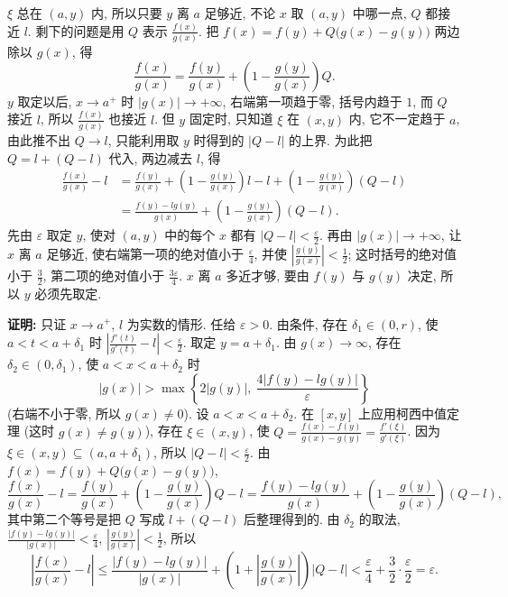 \documentclass[UTF8,openany]{ctexbook}
\theoremstyle{chinesetextbook}
\newenvironment{cnproof}{\par\indent\textbf{证明:} \ignorespaces}{\par}
\begin{document}
$\xi$ 总在 $(a,y)$ 内, 所以只要 $y$ 离 $a$ 足够近, 不论 $x$ 取 $(a,y)$ 中哪一点, $Q$ 都接近 $l$. 剩下的问题是用 $Q$ 表示 $\displaystyle\frac{f(x)}{g(x)}$. 把 $f(x)=f(y)+Q\bigl(g(x)-g(y)\bigr)$ 两边除以 $g(x)$, 得
\[
\frac{f(x)}{g(x)}=\frac{f(y)}{g(x)}+\left(1-\frac{g(y)}{g(x)}\right)Q.
\]
$y$ 取定以后, $x\to a^+$ 时 $|g(x)|\to+\infty$, 右端第一项趋于零, 括号内趋于 $1$, 而 $Q$ 接近 $l$, 所以 $\displaystyle\frac{f(x)}{g(x)}$ 也接近 $l$. 但 $y$ 固定时, 只知道 $\xi$ 在 $(x,y)$ 内, 它不一定趋于 $a$, 由此推不出 $Q\to l$, 只能利用取 $y$ 时得到的 $|Q-l|$ 的上界. 为此把 $Q=l+(Q-l)$ 代入, 两边减去 $l$, 得
\[
\begin{aligned}
\frac{f(x)}{g(x)}-l&=\frac{f(y)}{g(x)}+\left(1-\frac{g(y)}{g(x)}\right)l-l+\left(1-\frac{g(y)}{g(x)}\right)(Q-l)\\
&=\frac{f(y)-lg(y)}{g(x)}+\left(1-\frac{g(y)}{g(x)}\right)(Q-l).
\end{aligned}
\]
先由 $\varepsilon$ 取定 $y$, 使对 $(a,y)$ 中的每个 $x$ 都有 $\displaystyle|Q-l|<\frac\varepsilon2$. 再由 $|g(x)|\to+\infty$, 让 $x$ 离 $a$ 足够近, 使右端第一项的绝对值小于 $\displaystyle\frac\varepsilon4$, 并使 $\displaystyle\left|\frac{g(y)}{g(x)}\right|<\frac12$; 这时括号的绝对值小于 $\displaystyle\frac32$, 第二项的绝对值小于 $\displaystyle\frac{3\varepsilon}4$. $x$ 离 $a$ 多近才够, 要由 $f(y)$ 与 $g(y)$ 决定, 所以 $y$ 必须先取定.
\begin{cnproof}
只证 $x\to a^+$, $l$ 为实数的情形. 任给 $\varepsilon>0$. 由条件, 存在 $\delta_1\in(0,r)$, 使 $a<t<a+\delta_1$ 时 $\displaystyle\left|\frac{f'(t)}{g'(t)}-l\right|<\frac\varepsilon2$. 取定 $y=a+\delta_1$. 由 $g(x)\to\infty$, 存在 $\delta_2\in(0,\delta_1)$, 使 $a<x<a+\delta_2$ 时
\[
|g(x)|>\max\left\{2|g(y)|,\ \frac{4|f(y)-lg(y)|}\varepsilon\right\}
\]
(右端不小于零, 所以 $g(x)\ne0$). 设 $a<x<a+\delta_2$. 在 $[x,y]$ 上应用柯西中值定理 (这时 $g(x)\ne g(y)$), 存在 $\xi\in(x,y)$, 使 $\displaystyle Q=\frac{f(x)-f(y)}{g(x)-g(y)}=\frac{f'(\xi)}{g'(\xi)}$. 因为 $\xi\in(x,y)\subseteq(a,a+\delta_1)$, 所以 $\displaystyle|Q-l|<\frac\varepsilon2$. 由 $f(x)=f(y)+Q\bigl(g(x)-g(y)\bigr)$,
\[
\frac{f(x)}{g(x)}-l=\frac{f(y)}{g(x)}+\left(1-\frac{g(y)}{g(x)}\right)Q-l=\frac{f(y)-lg(y)}{g(x)}+\left(1-\frac{g(y)}{g(x)}\right)(Q-l),
\]
其中第二个等号是把 $Q$ 写成 $l+(Q-l)$ 后整理得到的. 由 $\delta_2$ 的取法, $\displaystyle\frac{|f(y)-lg(y)|}{|g(x)|}<\frac\varepsilon4$, $\displaystyle\left|\frac{g(y)}{g(x)}\right|<\frac12$, 所以
\[
\left|\frac{f(x)}{g(x)}-l\right|\le\frac{|f(y)-lg(y)|}{|g(x)|}+\left(1+\left|\frac{g(y)}{g(x)}\right|\right)|Q-l|<\frac\varepsilon4+\frac32\cdot\frac\varepsilon2=\varepsilon.
\]
\end{cnproof}
\end{document}
